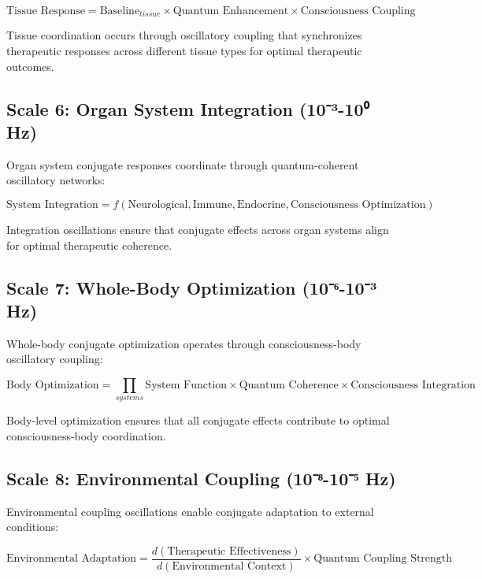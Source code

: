 \documentclass[12pt,a4paper]{article}
\begin{document}
\begin{equation}
\text{Tissue Response} = \text{Baseline}_{tissue} \times \text{Quantum Enhancement} \times \text{Consciousness Coupling}
\end{equation}

Tissue coordination occurs through oscillatory coupling that synchronizes therapeutic responses across different tissue types for optimal therapeutic outcomes.

\subsection{Scale 6: Organ System Integration (10⁻³-10⁰ Hz)}

Organ system conjugate responses coordinate through quantum-coherent oscillatory networks:

\begin{equation}
\text{System Integration} = f(\text{Neurological}, \text{Immune}, \text{Endocrine}, \text{Consciousness Optimization})
\end{equation}

Integration oscillations ensure that conjugate effects across organ systems align for optimal therapeutic coherence.

\subsection{Scale 7: Whole-Body Optimization (10⁻⁶-10⁻³ Hz)}

Whole-body conjugate optimization operates through consciousness-body oscillatory coupling:

\begin{equation}
\text{Body Optimization} = \prod_{systems} \text{System Function} \times \text{Quantum Coherence} \times \text{Consciousness Integration}
\end{equation}

Body-level optimization ensures that all conjugate effects contribute to optimal consciousness-body coordination.

\subsection{Scale 8: Environmental Coupling (10⁻⁸-10⁻⁵ Hz)}

Environmental coupling oscillations enable conjugate adaptation to external conditions:

\begin{equation}
\text{Environmental Adaptation} = \frac{d(\text{Therapeutic Effectiveness})}{d(\text{Environmental Context})} \times \text{Quantum Coupling Strength}
\end{equation}
\end{document}
